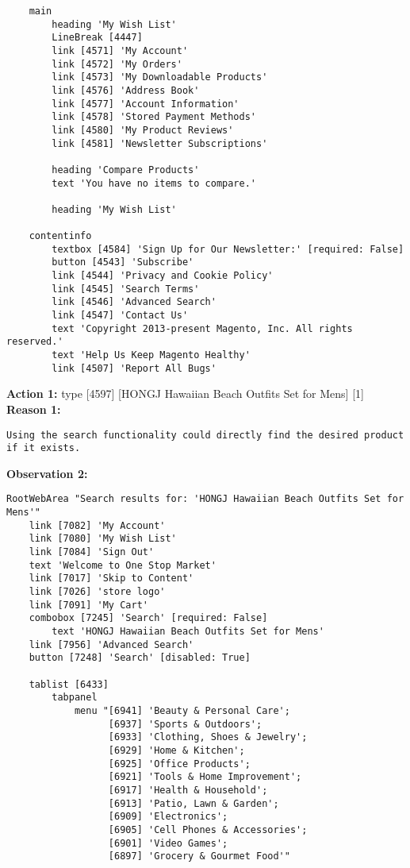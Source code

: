 \begin{tcolorbox}[breakable]
\begin{lstlisting}
    main
        heading 'My Wish List'
        LineBreak [4447]
        link [4571] 'My Account'
        link [4572] 'My Orders'
        link [4573] 'My Downloadable Products'
        link [4576] 'Address Book'
        link [4577] 'Account Information'
        link [4578] 'Stored Payment Methods'
        link [4580] 'My Product Reviews'
        link [4581] 'Newsletter Subscriptions'

        heading 'Compare Products'
        text 'You have no items to compare.'

        heading 'My Wish List'

    contentinfo
        textbox [4584] 'Sign Up for Our Newsletter:' [required: False]
        button [4543] 'Subscribe'
        link [4544] 'Privacy and Cookie Policy'
        link [4545] 'Search Terms'
        link [4546] 'Advanced Search'
        link [4547] 'Contact Us'
        text 'Copyright 2013-present Magento, Inc. All rights reserved.'
        text 'Help Us Keep Magento Healthy'
        link [4507] 'Report All Bugs'
\end{lstlisting}
\textbf{Action 1:} type [4597] [HONGJ Hawaiian Beach Outfits Set for Mens] [1]
\textbf{Reason 1:} 
\begin{lstlisting}
Using the search functionality could directly find the desired product if it exists.
\end{lstlisting}





\textbf{Observation 2:} 
\begin{lstlisting}
RootWebArea "Search results for: 'HONGJ Hawaiian Beach Outfits Set for Mens'"
    link [7082] 'My Account'
    link [7080] 'My Wish List'
    link [7084] 'Sign Out'
    text 'Welcome to One Stop Market'
    link [7017] 'Skip to Content'
    link [7026] 'store logo'
    link [7091] 'My Cart'
    combobox [7245] 'Search' [required: False]
        text 'HONGJ Hawaiian Beach Outfits Set for Mens'
    link [7956] 'Advanced Search'
    button [7248] 'Search' [disabled: True]

    tablist [6433]
        tabpanel
            menu "[6941] 'Beauty & Personal Care'; 
                  [6937] 'Sports & Outdoors'; 
                  [6933] 'Clothing, Shoes & Jewelry'; 
                  [6929] 'Home & Kitchen'; 
                  [6925] 'Office Products'; 
                  [6921] 'Tools & Home Improvement'; 
                  [6917] 'Health & Household'; 
                  [6913] 'Patio, Lawn & Garden'; 
                  [6909] 'Electronics'; 
                  [6905] 'Cell Phones & Accessories'; 
                  [6901] 'Video Games'; 
                  [6897] 'Grocery & Gourmet Food'"


\end{lstlisting}
\end{tcolorbox}
